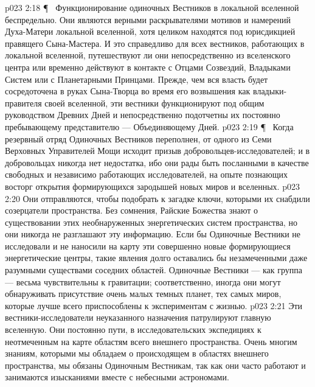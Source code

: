 \vs p023 2:18 \P\ \bibnobreakspace {} Функционирование одиночных Вестников в локальной вселенной беспредельно. Они являются верными раскрывателями мотивов и намерений Духа\hyp{}Матери локальной вселенной, хотя целиком находятся под юрисдикцией правящего Сына\hyp{}Мастера. И это справедливо для всех вестников, работающих в локальной вселенной, путешествуют ли они непосредственно из вселенского центра или временно действуют в контакте с Отцами Созвездий, Владыками Систем или с Планетарными Принцами. Прежде, чем вся власть будет сосредоточена в руках Сына\hyp{}Творца во время его возвышения как владыки\hyp{}правителя своей вселенной, эти вестники функционируют под общим руководством Древних Дней и непосредственно подотчетны их постоянно пребывающему представителю --- Объединяющему Дней.
\vs p023 2:19 \P\ \bibnobreakspace {} Когда резервный отряд Одиночных Вестников переполнен, от одного из Семи Верховных Управителей Мощи исходит призыв добровольцев\hyp{}исследователей; и в добровольцах никогда нет недостатка, ибо они рады быть посланными в качестве свободных и независимо работающих исследователей, на опыте познающих восторг открытия формирующихся зародышей новых миров и вселенных.
\vs p023 2:20 Они отправляются, чтобы подобрать к загадке ключи, которыми их снабдили созерцатели пространства. Без сомнения, Райские Божества знают о существовании этих необнаруженных энергетических систем пространства, но они никогда не разглашают эту информацию. Если бы Одиночные Вестники не исследовали и не наносили на карту эти совершенно новые формирующиеся энергетические центры, такие явления долго оставались бы незамеченными даже разумными существами соседних областей. Одиночные Вестники --- как группа --- весьма чувствительны к гравитации; соответственно, иногда они могут обнаруживать присутствие очень малых темных планет, тех самых миров, которые лучше всего приспособлены к экспериментам с жизнью.
\vs p023 2:21 Эти вестники\hyp{}исследователи неуказанного назначения патрулируют главную вселенную. Они постоянно пути, в исследовательских экспедициях к неотмеченным на карте областям всего внешнего пространства. Очень многим знаниям, которыми мы обладаем о происходящем в областях внешнего пространства, мы обязаны Одиночным Вестникам, так как они часто работают и занимаются изысканиями вместе с небесными астрономами.
